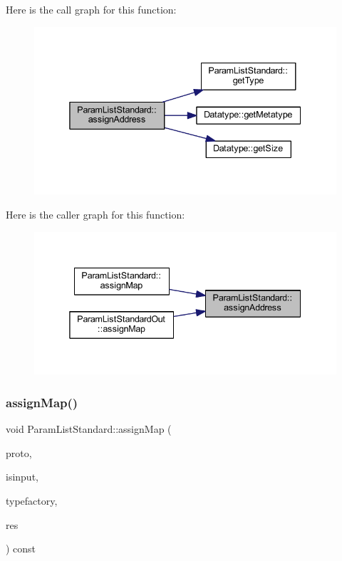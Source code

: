 Here is the call graph for this function\+:
\nopagebreak
\begin{figure}[H]
\begin{center}
\leavevmode
\includegraphics[width=338pt]{class_param_list_standard_a3775b16cc55e45ffb7c6626e99a935b7_cgraph}
\end{center}
\end{figure}
Here is the caller graph for this function\+:
\nopagebreak
\begin{figure}[H]
\begin{center}
\leavevmode
\includegraphics[width=338pt]{class_param_list_standard_a3775b16cc55e45ffb7c6626e99a935b7_icgraph}
\end{center}
\end{figure}
\mbox{\label{class_param_list_standard_a4819bb8291e202e3d11737d586878525}} 
\subsubsection{\texorpdfstring{assignMap()}{assignMap()}}
{\footnotesize\ttfamily void Param\+List\+Standard\+::assign\+Map (\begin{DoxyParamCaption}\item[{const vector$<$ \mbox{\hyperlink{class_datatype}{Datatype}} $\ast$ $>$ \&}]{proto,  }\item[{bool}]{isinput,  }\item[{\mbox{\hyperlink{class_type_factory}{Type\+Factory}} \&}]{typefactory,  }\item[{vector$<$ \mbox{\hyperlink{struct_parameter_pieces}{Parameter\+Pieces}} $>$ \&}]{res }\end{DoxyParamCaption}) const\hspace{0.3cm}{\ttfamily [virtual]}}



